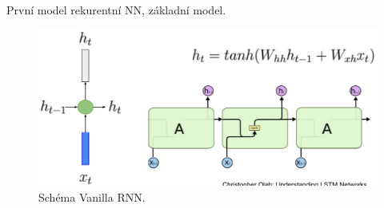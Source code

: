 \begin{compactitem}
    \item První model rekurentní NN, základní model.
\end{compactitem}

\begin{figure}[H]
    \centering
    \includegraphics[width=1\linewidth]{rnn-vanilla.pdf}
    \caption{Schéma Vanilla RNN.}
\end{figure}
